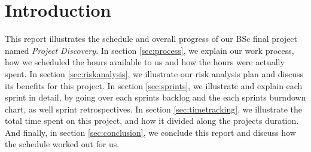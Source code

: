 \section{Introduction}\label{sec:introduction}

This report illustrates the schedule and overall progress of our BSc final project named \emph{Project Discovery}. In section \ref{sec:process}, we explain our work process, how we scheduled the hours available to us and how the hours were actually spent. In section \ref{sec:riskanalysis}, we illustrate our risk analysis plan and discuss its benefits for this project. In section \ref{sec:sprints}, we illustrate and explain each sprint in detail, by going over each sprints backlog and the each sprints burndown chart, as well sprint retrospectives. In section \ref{sec:timetracking}, we illustrate the total time spent on this project, and how it divided along the projects duration. And finally, in section \ref{sec:conclusion}, we conclude this report and discuss how the schedule worked out for us. 